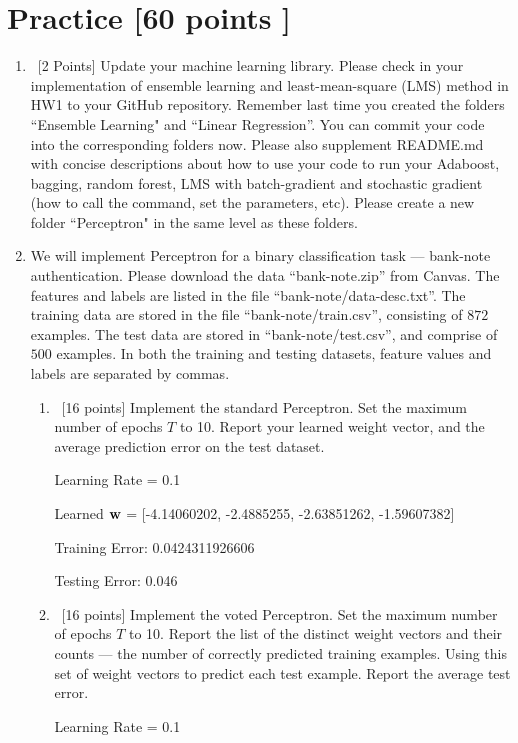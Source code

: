 \documentclass[12pt, fullpage,letterpaper]{article}
\begin{document}
\section{Practice [60 points ]}
\begin{enumerate}
	\item~[2 Points] Update your machine learning library. Please check in your implementation of ensemble learning and least-mean-square (LMS) method in HW1 to your GitHub repository. Remember last time you created the folders ``Ensemble Learning" and ``Linear Regression''. You can commit your code into the corresponding folders now. Please also supplement README.md with concise descriptions about how to use your code to run your Adaboost, bagging, random forest, LMS with batch-gradient and stochastic gradient (how to call the command, set the parameters, etc). Please create a new folder ``Perceptron" in the same level as these folders.  

\item We will implement  Perceptron for a binary classification task --- bank-note authentication. Please download the data ``bank-note.zip'' from Canvas. The features and labels are listed in the file ``bank-note/data-desc.txt''. The training data are stored in the file ``bank-note/train.csv'', consisting of $872$ examples. The test data are stored in ``bank-note/test.csv'', and comprise of $500$ examples. In both the training and testing datasets, feature values and labels are separated by commas. 
\begin{enumerate}
	\item~[16 points] Implement the standard Perceptron. Set the maximum number of epochs $T$ to 10. Report your learned weight vector, and the average prediction error on the test dataset. 
	
	\bigskip
	Learning Rate = 0.1
	
	Learned ${\bf w}$ = [-4.14060202, -2.4885255, -2.63851262, -1.59607382]
	
	Training Error: 0.0424311926606
	
	Testing Error: 0.046
	\bigskip

	\item~[16 points] Implement the voted Perceptron. Set the maximum number of epochs $T$ to 10. Report the list of the distinct weight vectors and their counts --- the number of correctly predicted training examples. Using this set of weight vectors to predict each test example. Report the average test error.
	
	\bigskip
	Learning Rate = 0.1
	

\end{enumerate}
\end{enumerate}
\end{document}
